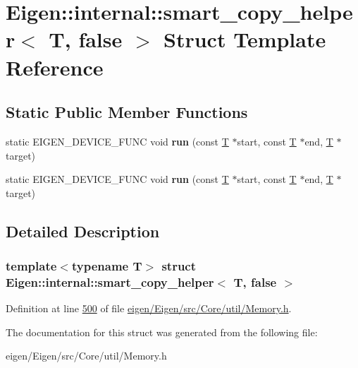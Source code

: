 \hypertarget{struct_eigen_1_1internal_1_1smart__copy__helper_3_01_t_00_01false_01_4}{}\section{Eigen\+:\+:internal\+:\+:smart\+\_\+copy\+\_\+helper$<$ T, false $>$ Struct Template Reference}
\label{struct_eigen_1_1internal_1_1smart__copy__helper_3_01_t_00_01false_01_4}
\subsection*{Static Public Member Functions}
\begin{DoxyCompactItemize}
\item 
\mbox{\label{struct_eigen_1_1internal_1_1smart__copy__helper_3_01_t_00_01false_01_4_a3402ad1bfee4744ffc250e1c05deb149}} 
static E\+I\+G\+E\+N\+\_\+\+D\+E\+V\+I\+C\+E\+\_\+\+F\+U\+NC void {\bfseries run} (const \hyperlink{group___sparse_core___module}{T} $\ast$start, const \hyperlink{group___sparse_core___module}{T} $\ast$end, \hyperlink{group___sparse_core___module}{T} $\ast$target)
\item 
\mbox{\label{struct_eigen_1_1internal_1_1smart__copy__helper_3_01_t_00_01false_01_4_a3402ad1bfee4744ffc250e1c05deb149}} 
static E\+I\+G\+E\+N\+\_\+\+D\+E\+V\+I\+C\+E\+\_\+\+F\+U\+NC void {\bfseries run} (const \hyperlink{group___sparse_core___module}{T} $\ast$start, const \hyperlink{group___sparse_core___module}{T} $\ast$end, \hyperlink{group___sparse_core___module}{T} $\ast$target)
\end{DoxyCompactItemize}


\subsection{Detailed Description}
\subsubsection*{template$<$typename T$>$\newline
struct Eigen\+::internal\+::smart\+\_\+copy\+\_\+helper$<$ T, false $>$}



Definition at line \hyperlink{eigen_2_eigen_2src_2_core_2util_2_memory_8h_source_l00500}{500} of file \hyperlink{eigen_2_eigen_2src_2_core_2util_2_memory_8h_source}{eigen/\+Eigen/src/\+Core/util/\+Memory.\+h}.



The documentation for this struct was generated from the following file\+:\begin{DoxyCompactItemize}
\item 
eigen/\+Eigen/src/\+Core/util/\+Memory.\+h\end{DoxyCompactItemize}
